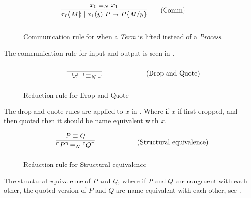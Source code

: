 \begin{figure}[h]
    \begin{align}
        & \infrule{x_0 \equiv_N x_1}{\lift{x_0}{M}\para\inp{x_1}{y}P\ra P\{M/y\}} \tag{Comm}
    \end{align}
    \caption{Communication rule for when a \textit{Term} is lifted instead of a \textit{Process}.}
    \label{fig:com}
\end{figure}
\noindent
The communication rule for input and output is seen in .


\begin{figure}[h]
    \begin{align}
        & \infrule{}{\quot{\drop{x}}\equiv _N x} \tag{Drop and Quote}
    \end{align}
    \caption{Reduction rule for Drop and Quote}
    \label{fig:dropquot}
\end{figure}
\noindent
The drop and quote rules are applied to $x$ in . Where if $x$ if first dropped, and then quoted then it should be name equivalent with $x$.


\begin{figure}[h]
    \begin{align}
        & \infrule{P\equiv Q}{\quot{P} \equiv _N \quot{Q}} \tag{Structural equivalence}
    \end{align}
    \caption{Reduction rule for Structural equivalence}
    \label{fig:strucequiv}
\end{figure}
\noindent
The structural equivalence of $P$ and $Q$, where if $P$ and $Q$ are congruent with each other, the quoted version of $P$ and $Q$ are name equivalent with each other, see .


